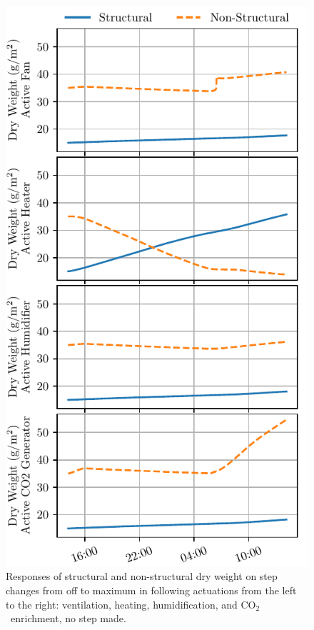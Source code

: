 \documentclass[conference]{IEEEtran}
\newcommand{\coo}{\ensuremath{\mathrm{CO_2}}}
\begin{document}
\begin{figure}
    \centering
    \includegraphics[width=\textwidth]{figures/step_response-outputs-2024-10-11_2024-10-26-120s.pdf}
    \caption{Responses of structural and non-structural dry weight on step changes from off to maximum in following actuations from the left to the right: ventilation, heating, humidification, and \coo\ enrichment, no step made.}\label{fig:steps}
\end{figure}
\end{document}
